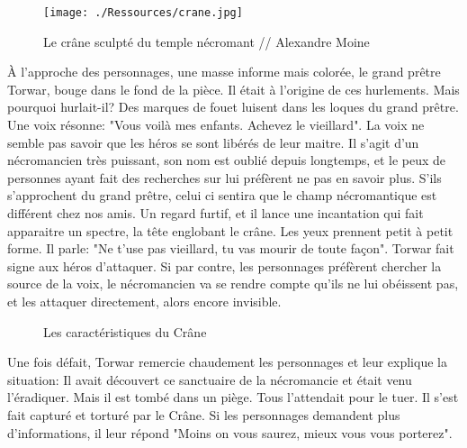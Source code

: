 \documentclass[a4paper, 11pt]{article}
\begin{document}
\begin{figure}[ht]
\begin{center}
\hypertarget{crane}{}
\texttt{[image: ./Ressources/crane.jpg]}
\caption{Le crâne sculpté du temple nécromant // Alexandre Moine }
\end{center}
\end{figure}

À l'approche des personnages, une masse informe mais colorée, le grand prêtre Torwar, bouge dans le fond de la pièce. Il était à l'origine de ces hurlements. Mais pourquoi hurlait-il? Des marques de fouet luisent dans les loques du grand prêtre.
Une voix résonne: "Vous voilà mes enfants. Achevez le vieillard". La voix ne semble pas savoir que les héros se sont libérés de leur maitre. Il s'agit d'un nécromancien très puissant, son nom est oublié depuis longtemps, et le peux de personnes ayant fait des recherches sur lui préfèrent ne pas en savoir plus.
\newline
S'ils s'approchent du grand prêtre, celui ci sentira que le champ nécromantique est différent chez nos amis. Un regard furtif, et il lance une incantation qui fait apparaitre un spectre, la tête englobant le crâne. Les yeux prennent petit à petit forme. Il parle: "Ne t'use pas vieillard, tu vas mourir de toute façon". Torwar fait signe aux héros d'attaquer.
\newline
Si par contre, les personnages préfèrent chercher la source de la voix, le nécromancien va se rendre compte qu'ils ne lui obéissent pas, et les attaquer directement, alors encore invisible.
\newline
\begin{figure}[ht]
\begin{center}
\caption{Les caractéristiques du Crâne}
\end{center}
\end{figure}
Une fois défait, Torwar remercie chaudement les personnages et leur explique la situation: Il avait découvert ce sanctuaire de la nécromancie et était venu l'éradiquer. Mais il est tombé dans un piège. Tous l'attendait pour le tuer. Il s'est fait capturé et torturé par le Crâne. Si les personnages demandent plus d'informations, il leur répond "Moins on vous saurez, mieux vous vous porterez".
\end{document}
